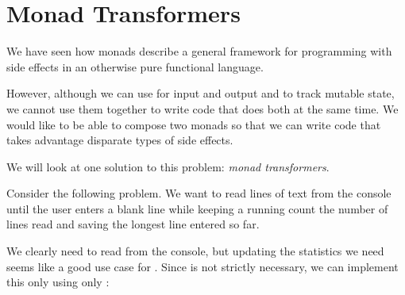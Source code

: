 \section{Monad Transformers}

We have seen how monads describe a general framework for programming with side effects
in an otherwise pure functional language.

However, although we can use  for input and output and  to track mutable state,
we cannot use them together to write code that does both at the same time. We would like to be able
to compose two monads so that we can write code that takes advantage disparate types of side effects.

We will look at one solution to this problem: \textit{monad transformers}. 

Consider the following problem. We want to read lines of text from the console until the user enters
a blank line while keeping a running count the number of lines read and saving the longest line entered so far.

We clearly need  to read from the console, but updating the statistics we need seems like
a good use case for . Since  is not strictly necessary, we can implement
this only using only :



